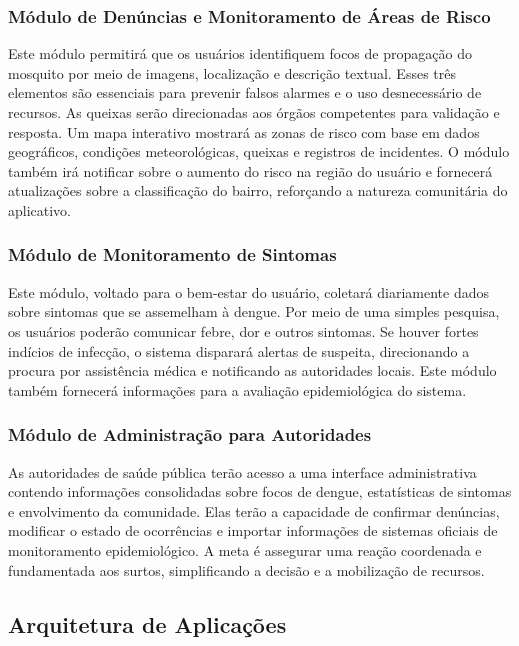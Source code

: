 \documentclass[a4paper, 12pt]{article}
\begin{document}
\subsubsection{Módulo de Denúncias e Monitoramento de Áreas de Risco}

Este módulo permitirá que os usuários identifiquem focos de propagação do mosquito por meio de imagens, localização e descrição textual. Esses três elementos são essenciais para prevenir falsos alarmes e o uso desnecessário de recursos.   As queixas serão direcionadas aos órgãos competentes para validação e resposta.   Um mapa interativo mostrará as zonas de risco com base em dados geográficos, condições meteorológicas, queixas e registros de incidentes.   O módulo também irá notificar sobre o aumento do risco na região do usuário e fornecerá atualizações sobre a classificação do bairro, reforçando a natureza comunitária do aplicativo.

\subsubsection{Módulo de Monitoramento de Sintomas}

Este módulo, voltado para o bem-estar do usuário, coletará diariamente dados sobre sintomas que se assemelham à dengue.  Por meio de uma simples pesquisa, os usuários poderão comunicar febre, dor e outros sintomas.  Se houver fortes indícios de infecção, o sistema disparará alertas de suspeita, direcionando a procura por assistência médica e notificando as autoridades locais.  Este módulo também fornecerá informações para a avaliação epidemiológica do sistema.

\subsubsection{Módulo de Administração para Autoridades}

As autoridades de saúde pública terão acesso a uma interface administrativa contendo informações consolidadas sobre focos de dengue, estatísticas de sintomas e envolvimento da comunidade.  Elas terão a capacidade de confirmar denúncias, modificar o estado de ocorrências e importar informações de sistemas oficiais de monitoramento epidemiológico.  A meta é assegurar uma reação coordenada e fundamentada aos surtos, simplificando a decisão e a mobilização de recursos.


\subsection{Arquitetura de Aplicações}
\end{document}
